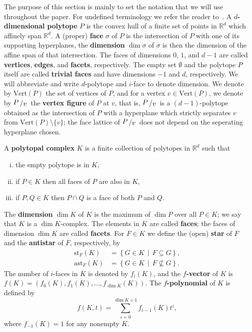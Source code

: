 \documentclass[a4paper,leqno]{article}
\theoremstyle{definition}
\newcommand{\anst}{\mathrm{ast}}
\newcommand{\vertices}{\mathrm{Vert}}
\newcommand{\st}{\mathrm{st}}
\newcommand{\set}[2]{\left\{ #1\,\middle|\, #2\right\}}
\newcommand{\R}{\mathbb{R}}
\newcommand{\vfig}[2]{{\raisebox{.1em}{$#1$}\left/\raisebox{-.1em}{$#2$}\right.}}
\begin{document}
The purpose of this section is mainly to set the notation that we will use throughout the paper. For undefined terminology we refer the reader to~\cite{Zieg95}. A {\bf $d$-dimensional polytope} $P$ is the convex hull of a finite set of points in $\R^d$ which affinely span $\R^d$. A (proper) {\bf face} $\sigma$ of $P$ is the intersection of $P$ with one of its supporting hyperplanes, the {\bf dimension} $\dim\sigma$ of $\sigma$ is then the dimension of the affine span of that intersection. The faces of dimensions $0$, $1$, and $d-1$ are called {\bf vertices}, {\bf edges}, and {\bf facets}, respectively. The empty set $\emptyset$ and the polytope $P$ itself are called {\bf trivial faces} and have dimensions $-1$ and $d$, respectively. We will abbreviate and write $d$-polytope and $i$-face to denote dimension.
We denote by $\vertices(P)$ the set of vertices of $P$, and for a vertex $v\in\vertices(P)$, we denote by $\vfig{P}{v}$ the {\bf vertex figure} of $P$ at $v$, that is, $\vfig{P}{v}$ is a $(d-1)$-polytope obtained as the intersection of $P$ with a hyperplane which strictly separates $v$ from $\vertices(P)\setminus\{v\}$; the face lattice of $\vfig{P}{v}$ does not depend on the seperating hyperplane chosen.

A {\bf polytopal complex} $K$ is a finite collection of polytopes in $\R^d$ such that
\begin{enumerate}[(i)]
\item the empty polytope is in $K$,
\item if $P\in K$ then all faces of $P$ are also in $K$,
\item if $P,Q\in K$ then $P\cap Q$ is a face of both $P$ and $Q$.
\end{enumerate}
The {\bf dimension} $\dim K$ of $K$ is the maximum of $\dim P$ over all $P\in K$; we say that $K$ is a $\dim K$-complex. %
The elements in $K$ are called {\bf faces}; the faces of dimension $\dim K$ are called {\bf facets}.
For $F\in K$ we define the (open) {\bf star} of $F$ and the {\bf antistar} of $F$, respectively, by
\begin{align*}
\st_F(K)&=\set{G\in K}{F\subseteq G},\\
\anst_F(K)&=\set{G\in K}{F\nsubseteq G}.
\end{align*}
The number of $i$-faces in $K$ is denoted by $f_i(K)$, and the {\bf $f$-vector} of $K$ is $f(K)=\left(f_0(K),f_1(K),\dots ,f_{\dim K}(K)\right)$. The {\bf $f$-polynomial} of $K$ is defined by
\[
f(K,t)=\sum_{i=0}^{\dim K+1} f_{i-1}(K)t^i,
\]
where $f_{-1}(K) = 1$ for any nonempty $K$.
\end{document}
